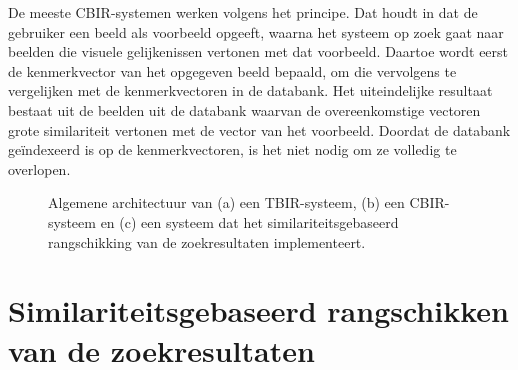 De meeste CBIR-systemen werken volgens het  principe. Dat houdt in dat de
gebruiker een beeld als voorbeeld opgeeft, waarna het systeem op zoek gaat naar beelden
die visuele gelijkenissen vertonen met dat voorbeeld. Daartoe wordt eerst de kenmerkvector van
het opgegeven beeld bepaald, om die vervolgens te vergelijken met de kenmerkvectoren in
de databank. Het uiteindelijke resultaat bestaat uit de beelden uit de databank 
waarvan de overeenkomstige vectoren grote similariteit vertonen met de vector van het 
voorbeeld. Doordat de databank ge\"indexeerd is op de kenmerkvectoren, is het niet nodig
om ze volledig te overlopen.

\begin{figure}[!b]
\vspace{10pt}
\centering
{}
\vspace{5pt}
\vspace{5pt}
\caption{\label{fig:cbir_en_tbir}Algemene architectuur van (a) een TBIR-systeem, 
(b) een CBIR-systeem en (c) een systeem dat het similariteitsgebaseerd rangschikking
van de zoekresultaten implementeert.}
\end{figure}

\section{Similariteitsgebaseerd rangschikken van de zoekresultaten}

